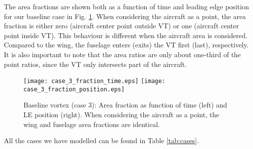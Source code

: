 \documentclass[smallextended]{svjour3}       %
\begin{document}
The area fractions are shown both as a function of time and leading edge position for our baseline case in Fig. \ref{fig:case_3_frac}. When considering the aircraft as a point, the area fraction is either zero (aircraft center point outside VT) or one (aircraft center point inside VT). This behaviour is different when the aircraft area is considered. Compared to the wing, the fuselage enters (exits) the VT first (last), respectively. It is also important to note that the area ratios are only about one-third of the point ratios, since the VT only intersects part of the aircraft.

\begin{figure}
\texttt{[image: case\_3\_fraction\_time.eps]}
\hspace{0.5cm}
\texttt{[image: case\_3\_fraction\_position.eps]}
\caption{Baseline vortex (case 3): Area fraction as function of time (left) and LE position (right). When considering the aircraft as a point, the wing and fuselage area fractions are identical.}
\label{fig:case_3_frac}
\end{figure}

All the cases we have modelled can be found in Table \ref{tab:cases}.
\end{document}
